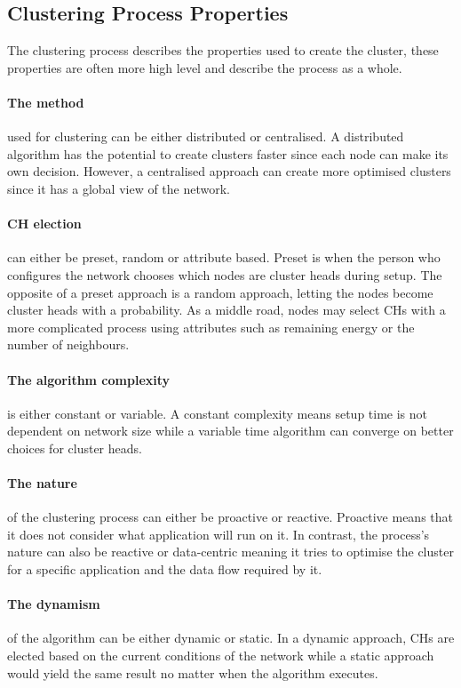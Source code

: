 \subsection{Clustering Process Properties}
The clustering process describes the properties used to create the cluster, these properties are often more high level and describe the process as a whole.

\paragraph*{The method} used for clustering can be either distributed or centralised. A distributed algorithm has the potential to create clusters faster since each node can make its own decision. However, a centralised approach can create more optimised clusters since it has a global view of the network.

\paragraph*{CH election} can either be preset, random or attribute based. Preset is when the person who configures the network chooses which nodes are cluster heads during setup. The opposite of a preset approach is a random approach, letting the nodes become cluster heads with a probability. As a middle road, nodes may select CHs with a more complicated process using attributes such as remaining energy or the number of neighbours.


\paragraph*{The algorithm complexity} is either constant or variable. A constant complexity means setup time is not dependent on network size while a variable time algorithm can converge on better choices for cluster heads. 

\paragraph*{The nature} of the clustering process can either be proactive or reactive. Proactive means that it does not consider what application will run on it. In contrast, the process's nature can also be reactive or data-centric meaning it tries to optimise the cluster for a specific application and the data flow required by it.

\paragraph*{The dynamism} of the algorithm can be either dynamic or static. In a dynamic approach, CHs are elected based on the current conditions of the network while a static approach would yield the same result no matter when the algorithm executes.


